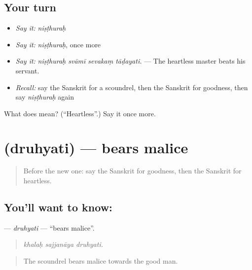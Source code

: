 \subsection*{Your turn}
\begin{itemize}
\raggedright
  \item \emph{Say it:} \emph{niṣṭhuraḥ}
  \item \emph{Say it:} \emph{niṣṭhuraḥ}, once more
  \item \emph{Say it:} \emph{niṣṭhuraḥ svāmī sevakaṃ tāḍayati.} — The heartless master beats his servant.
  \item \emph{Recall:} say the Sanskrit for a scoundrel, then the Sanskrit for goodness, then say \emph{niṣṭhuraḥ} again
\end{itemize}

\begin{tcolorbox}[breakable,colback=teal!4,colframe=teal!35!black,title={Before you move on}]
What does  mean? (\textquotedblleft{}Heartless\textquotedblright{}.) Say it once more.
\end{tcolorbox}
\section[\texorpdfstring{\sk{द्रुह्यति} (druhyati)}{द्रुह्यति (druhyati)}]{ (druhyati) — bears malice}

\label{lesson:SA-C461-druhyati}



\begin{quote}
Before the new one: say the Sanskrit for goodness, then the Sanskrit for heartless.
\end{quote}

\subsection*{You'll want to know: }
\textbf{} — \emph{druhyati} — \textquotedblleft{}bears malice\textquotedblright{}.

\begin{quote}
  
\end{quote}

\begin{quote}
\emph{khalaḥ sajjanāya druhyati.}
\end{quote}

\begin{quote}
The scoundrel bears malice towards the good man.
\end{quote}

